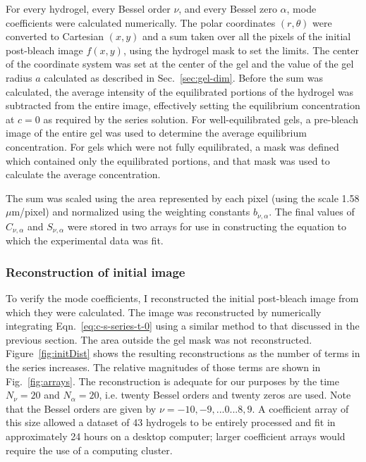 For every hydrogel, every Bessel order $\nu$, and every Bessel zero $\alpha$, mode coefficients were calculated numerically.  The polar coordinates $(r,\theta)$ were converted to Cartesian $(x,y)$ and a sum taken over all the pixels of the initial post-bleach image $f(x,y)$, using the hydrogel mask to set the limits.  The center of the coordinate system was set at the center of the gel and the value of the gel radius $a$ calculated as described in Sec.~\ref{sec:gel-dim}. Before the sum was calculated, the average intensity of the equilibrated portions of the hydrogel was subtracted from the entire image, effectively setting the equilibrium concentration at $c=0$ as required by the series solution.  For well-equilibrated gels, a pre-bleach image of the entire gel was used to determine the average equilibrium concentration.  For gels which were not fully equilibrated, a mask was defined which contained only the equilibrated portions, and that mask was used to calculate the average concentration.

The sum was scaled using the area represented by each pixel (using the scale 1.58 $\mu$m/pixel) and normalized using the weighting constants $b_{\nu,\alpha}$.  The final values of $C_{\nu,\alpha}$ and $S_{\nu,\alpha}$ were stored in two arrays for use in constructing the equation to which the experimental data was fit.


\subsubsection{Reconstruction of initial image}

To verify the mode coefficients, I reconstructed the initial post-bleach image from which they were calculated.  The image was reconstructed by numerically integrating Eqn.~\ref{eq:c-s-series-t-0} using a similar method to that discussed in the previous section.  The area outside the gel mask was not reconstructed.  Figure~\ref{fig:initDist} shows the resulting reconstructions as the number of terms in the series increases.  The relative magnitudes of those terms are shown in Fig.~\ref{fig:arrays}.  The reconstruction is adequate for our purposes by the time $N_\nu = 20$ and $N_\alpha = 20$, i.e. twenty Bessel orders and twenty zeros are used.  Note that the Bessel orders are given by $\nu = -10,-9,...0...8,9$.  A coefficient array of this size allowed a dataset of 43 hydrogels to be entirely processed and fit in approximately 24 hours on a desktop computer; larger coefficient arrays would require the use of a computing cluster.

